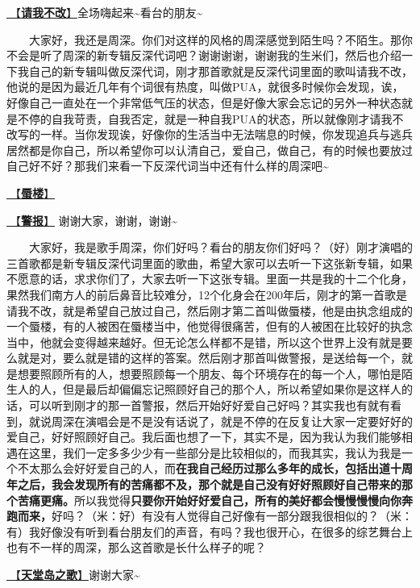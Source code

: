 \documentclass[]{ctexbook}
\begin{document}
\hyperref[brave-heart]{🎵【\textbf{请我不改}】}全场嗨起来\textasciitilde 看台的朋友\textasciitilde{}

  大家好，我还是周深。你们对这样的风格的周深感觉到陌生吗？不陌生。那你不会是听了周深的新专辑反深代词吧？谢谢谢谢，谢谢我的生米们，然后也介绍一下我自己的新专辑叫做反深代词，刚才那首歌就是反深代词里面的歌叫请我不改，他说的是因为最近几年有个词很有热度，叫做PUA，就很多时候你会发现，诶，好像自己一直处在一个非常低气压的状态，但是好像大家会忘记的另外一种状态就是不停的自我苛责，自我否定，就是一种自我PUA的状态，所以就像刚才请我不改写的一样。当你发现诶，好像你的生活当中无法喘息的时候，你发现追兵与逃兵居然都是你自己，所以希望你可以认清自己，爱自己，做自己，有的时候也要放过自己好不好？那我们来看一下反深代词当中还有什么样的周深吧\textasciitilde{}

\hyperref[mirage]{🎵【\textbf{蜃楼}】}

\hyperref[the-giver]{🎵【\textbf{警报}】} 谢谢大家，谢谢，谢谢\textasciitilde{}

  大家好，我是歌手周深，你们好吗？看台的朋友你们好吗？（好）刚才演唱的三首歌都是新专辑反深代词里面的歌曲，希望大家可以去听一下这张新专辑，如果不愿意的话，求求你们了，大家去听一下这张专辑。里面一共是我的十二个化身，果然我们南方人的前后鼻音比较难分，12个化身会在200年后，刚才的第一首歌是请我不改，就是希望自己放过自己，然后刚才第二首叫做蜃楼，他是由执念组成的一个蜃楼，有的人被困在蜃楼当中，他觉得很痛苦，但有的人被困在比较好的执念当中，他就会变得越来越好。但无论怎么样都不是错，所以这个世界上没有就是要么就是对，要么就是错的这样的答案。然后刚才那首叫做警报，是送给每一个，就是想要照顾所有的人，想要照顾每一个朋友、每个环境存在的每一个人，哪怕是陌生人的人，但是最后却偏偏忘记照顾好自己的那个人，所以希望如果你是这样人的话，可以听到刚才的那一首警报，然后开始好好爱自己好吗？其实我也有就有看到，就说周深在演唱会是不是没有话说了，就是不停的在反复让大家一定要好好的爱自己，好好照顾好自己。我后面也想了一下，其实不是，因为我认为我们能够相遇在这里，我们一定多多少少有一些部分是比较相似的，而我其实，我认为我是一个不太那么会好好爱自己的人，而\textbf{在我自己经历过那么多年的成长，包括出道十周年之后，我会发现所有的苦痛都不及，那个就是自己没有好好照顾好自己带来的那个苦痛更痛。}所以我觉得\textbf{只要你开始好好爱自己，所有的美好都会慢慢慢慢向你奔跑而来，}好吗？（米：好）有没有人觉得自己好像有一部分跟我很相似的？（米：有）我好像没有听到看台朋友们的声音，有吗？我也很开心，在很多的综艺舞台上也有不一样的周深，那么这首歌是长什么样子的呢？

\hyperref[haven-song]{🎵【\textbf{天堂岛之歌}】}谢谢大家\textasciitilde{}
\end{document}
